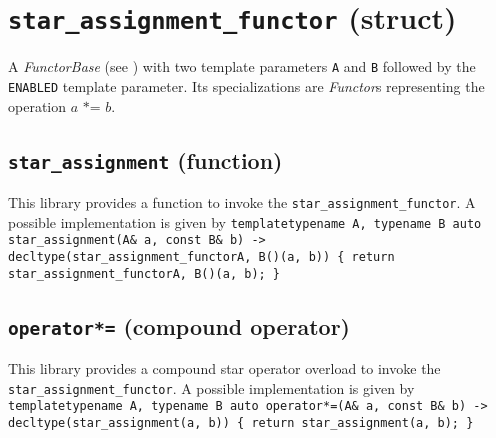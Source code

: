 %
%
%
%
%
%
%

\section{\texttt{star\_assignment\_functor} (struct)}
A \textit{FunctorBase} (see \cite{functors}) with two template parameters \texttt{A} and \texttt{B} followed by the \texttt{ENABLED} template parameter.
Its specializations are \textit{Functor}s representing the operation $\textit{a *= b}$.

\subsection{\texttt{star\_assignment} (function)}
This library provides a function to invoke the \texttt{star\_assignment\_functor}.
A possible implementation is given by\newline
\texttt{template\textlangle typename A, typename B\textrangle\newline
auto\newline
star\_assignment(A\& a, const B\& b)\newline
-> decltype(star\_assignment\_functor\textlangle A, B\textrangle()(a, b))\newline
\{ return star\_assignment\_functor\textlangle A, B\textrangle()(a, b); \}}

\subsection{\texttt{operator*=} (compound operator)}
This library provides a compound star operator overload to invoke the \texttt{star\_assignment\_functor}.
A possible implementation is given by\newline
\texttt{template\textlangle typename A, typename B\textrangle\newline
auto\newline
operator*=(A\& a, const B\& b)\newline
-> decltype(star\_assignment(a, b))\newline
\{ return star\_assignment(a, b); \}}
